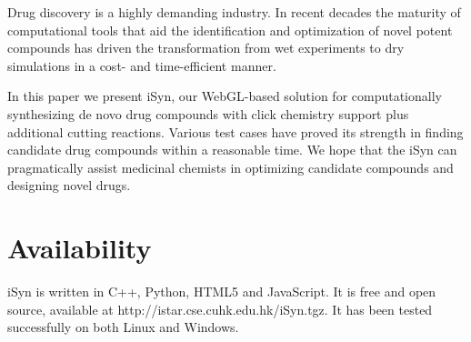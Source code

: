 Drug discovery is a highly demanding industry. In recent decades the maturity of computational tools that aid the identification and optimization of novel potent compounds has driven the transformation from wet experiments to dry simulations in a cost- and time-efficient manner.

In this paper we present iSyn, our WebGL-based solution for computationally synthesizing de novo drug compounds with click chemistry support plus additional cutting reactions. Various test cases have proved its strength in finding candidate drug compounds within a reasonable time. We hope that the iSyn can pragmatically assist medicinal chemists in optimizing candidate compounds and designing novel drugs.

\section{Availability}

iSyn is written in C++, Python, HTML5 and JavaScript. It is free and open source, available at http://istar.cse.cuhk.edu.hk/iSyn.tgz. It has been tested successfully on both Linux and Windows.



